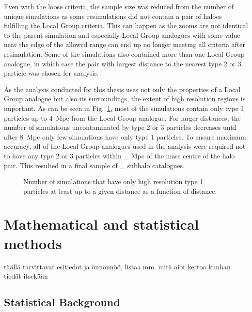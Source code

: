 \documentclass[english, oneside]{HYgradu}
\begin{document}
Even with the loose criteria, the sample size was reduced from the number of unique simulations as some resimulations did not contain a pair of haloes fulfilling the Local Group criteria. This can happen as the zooms are not identical to the parent simulation and especially Local Group analogues with some value near the edge of the allowed range can end up no longer meeting all criteria after resimulation. Some of the simulations also contained more than one Local Group analogue, in which case the pair with largest distance to the nearest type 2 or 3 particle was chosen for analysis.

As the analysis conducted for this thesis uses not only the properties of a Local Group analogue but also its surroundings, the extent of high resolution regions is important. As can be seen in Fig.\ \ref{fig:uncontaminatedDistances}, most of the simulations contain only type 1 particles up to 4~Mpc from the Local Group analogue. For larger distances, the number of simulations uncontaminated by type 2 or 3 particles decreases until after 8~Mpc only few simulations have only type 1 particles.
To ensure maximum accuracy, all of the Local Group analogues used in the analysis were required not to have any type 2 or 3 particles within \_ Mpc of the mass centre of the halo pair. %
This resulted in a final sample of \_ subhalo catalogues. %


\begin{figure}
    \centering
    
    \caption{Number of simulations that have only high resolution type 1 particles at least up to a given distance as a function of distance.}\label{fig:uncontaminatedDistances}
\end{figure}

\chapter{Mathematical and statistical methods}
täällä tarvittavat esitiedot ja önnönnöö, listaa mm. mitä aiot kertoa kunhan tiedät itsekään

\section{Statistical Background}
\end{document}
